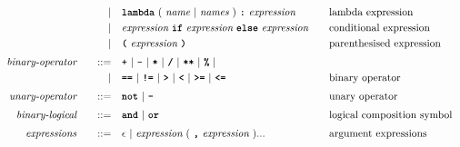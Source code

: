 \begin{alignat*}{9}
&&                          &&         | \quad & \textbf{\texttt{lambda}}\ (\ \textit{name}\ |\ \textit{names}\ )\ \texttt{\textbf{:}}\ \textit{expression}        && \textrm{lambda expression}                \\
&&                          &&         | \quad & \textit{expression}\ \textbf{\texttt{if}}\ \textit{expression}\ \textbf{\texttt{else}}\ \textit{expression} \quad && \textrm{conditional expression}           \\
&&                          &&         | \quad & \textbf{\texttt{(}}\ \textit{expression}\ \textbf{\texttt{)}}                                                     && \textrm{parenthesised expression}         \\[1mm]
&& \textit{binary-operator} && \quad ::= \quad & \textbf{\texttt{+}}\ |\ \textbf{\texttt{-}}\ |\ \textbf{\texttt{*}}\ |
                                                 \ \textbf{\texttt{/}}\ |\ \textbf{\texttt{**}}\ |\ \textbf{\texttt{\%}}\ |                                                                                     \\
&&                          &&         | \quad & \textbf{\texttt{==}}\ |\ \textbf{\texttt{!=}}\ |\ \texttt{\textbf{>}}\ |
                                                 \ \texttt{\textbf{<}}\ |\ \texttt{\textbf{>=}}\ |\ \texttt{\textbf{<=}} && \textrm{binary operator}                                                            \\[1mm]
&& \textit{unary-operator}  && \quad ::= \quad & \textbf{\texttt{not}}\ |\ \textbf{\texttt{-}}                                                                     && \textrm{unary operator}                   \\[1mm]
&& \textit{binary-logical}  && \quad ::= \quad & \textbf{\texttt{and}}\ |\ \texttt{\textbf{or}}                                                                    && \textrm{logical composition symbol}       \\[1mm]
&& \textit{expressions}     && \quad ::= \quad & \epsilon\ |\ \textit{expression}\ (\ \textbf{\texttt{,}}\ \textit{expression}\ ) ...                              && \textrm{argument expressions}
\end{alignat*}
